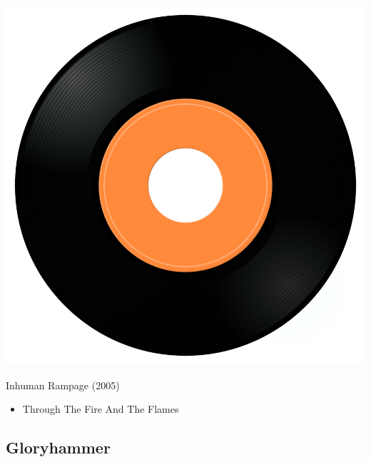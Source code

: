 \begin{minipage}[t]{0.25\textwidth}
\captionsetup{type=figure}
\includegraphics[width=\textwidth]{Images/cover.png}
\caption*{Inhuman Rampage (2005)}
\end{minipage}
\begin{minipage}[t]{0.25\textwidth}\vspace{0pt}
\begin{itemize}[nosep,leftmargin=1em,labelwidth=*,align=left]
	\setlength{\itemsep}{0pt}
	\item Through The Fire And The Flames
\end{itemize}
\end{minipage}

\subsection{Gloryhammer}

